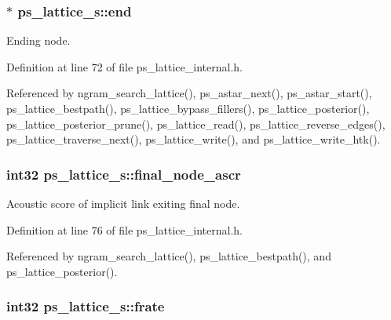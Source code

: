 \subsubsection[{end}]{$\ast$ ps\-\_\-lattice\-\_\-s\-::end}\label{structps__lattice__s_a00f30e2689853d6bcb31c8005a69dc7b}


Ending node. 



Definition at line 72 of file ps\-\_\-lattice\-\_\-internal.\-h.



Referenced by ngram\-\_\-search\-\_\-lattice(), ps\-\_\-astar\-\_\-next(), ps\-\_\-astar\-\_\-start(), ps\-\_\-lattice\-\_\-bestpath(), ps\-\_\-lattice\-\_\-bypass\-\_\-fillers(), ps\-\_\-lattice\-\_\-posterior(), ps\-\_\-lattice\-\_\-posterior\-\_\-prune(), ps\-\_\-lattice\-\_\-read(), ps\-\_\-lattice\-\_\-reverse\-\_\-edges(), ps\-\_\-lattice\-\_\-traverse\-\_\-next(), ps\-\_\-lattice\-\_\-write(), and ps\-\_\-lattice\-\_\-write\-\_\-htk().

\subsubsection[{final\-\_\-node\-\_\-ascr}]{\setlength{\rightskip}{0pt plus 5cm}int32 ps\-\_\-lattice\-\_\-s\-::final\-\_\-node\-\_\-ascr}\label{structps__lattice__s_aba113d4134c72d7405423c77bcc1247e}


Acoustic score of implicit link exiting final node. 



Definition at line 76 of file ps\-\_\-lattice\-\_\-internal.\-h.



Referenced by ngram\-\_\-search\-\_\-lattice(), ps\-\_\-lattice\-\_\-bestpath(), and ps\-\_\-lattice\-\_\-posterior().

\subsubsection[{frate}]{\setlength{\rightskip}{0pt plus 5cm}int32 ps\-\_\-lattice\-\_\-s\-::frate}\label{structps__lattice__s_a5159a2ff1e03a7c9782854bc67e56530}


